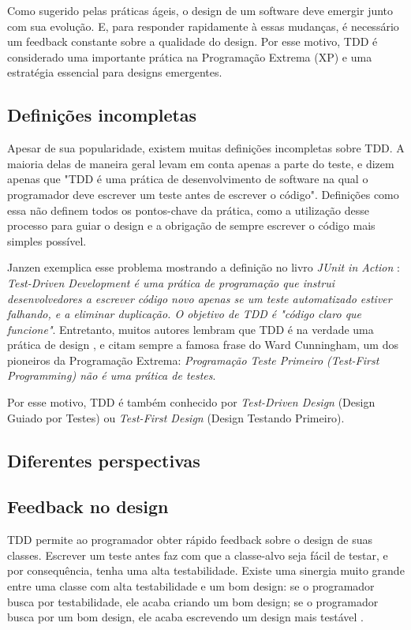 Como sugerido pelas práticas ágeis,
o design de um software deve emergir junto com sua evolução. E, para responder rapidamente à essas mudanças, é necessário
um feedback constante sobre a qualidade do design. Por esse motivo, TDD é considerado uma importante prática na Programação 
Extrema (XP) \cite{XPExplained} e uma estratégia essencial para designs emergentes.

\subsection{Definições incompletas} 
\label{sec:tdd-definicoes-incompletas}

Apesar de sua popularidade, existem muitas definições incompletas sobre TDD. A maioria delas de maneira geral levam em conta
apenas a parte do teste, e dizem apenas
que "TDD é uma prática de desenvolvimento de software na qual o programador deve escrever um teste antes de escrever o código".
Definições como essa não definem todos os pontos-chave da prática, como a utilização desse processo para guiar o design e
a obrigação de sempre escrever o código mais simples possível.

Janzen \cite{tdd-taxonomy} exemplica esse problema mostrando a definição no livro \textit{JUnit in Action} \cite{junit-in-action}:
\textit{Test-Driven Development é uma prática de programação que instrui desenvolvedores a escrever código novo apenas se um teste
automatizado estiver falhando, e a eliminar duplicação. O objetivo de TDD é "código claro que funcione"}. 
Entretanto, muitos autores lembram que TDD é na verdade uma prática de design \cite{tdd-taxonomy} \cite{aim-fire}, 
e citam sempre a famosa frase do Ward Cunningham, um dos pioneiros da Programação Extrema:
\textit{Programação Teste Primeiro (Test-First Programming) não é uma prática de testes}. 

Por esse motivo, TDD é também conhecido por \textit{Test-Driven Design} (Design Guiado por Testes) ou \textit{Test-First Design}
(Design Testando Primeiro).

\subsection{Diferentes perspectivas}


\subsection{Feedback no design}

TDD permite ao programador obter rápido feedback sobre o design de suas classes. Escrever um teste antes faz com que
a classe-alvo seja fácil de testar, e por consequência, tenha uma alta testabilidade. Existe uma sinergia muito
grande entre uma classe com alta testabilidade e um bom design: se o programador busca por testabilidade,
ele acaba criando um bom design; se o programador busca por um bom design, ele acaba escrevendo um design mais testável \cite{feathers-synergy}.  

